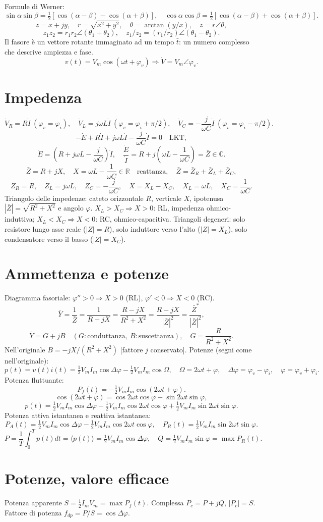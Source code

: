 \documentclass[11pt,a4paper]{article}
\newcommand{\pagina}[2]{\clearpage\section*{#2}}
\begin{document}
Formule di Werner:
\[\sin\alpha\sin\beta=\tfrac12[\cos(\alpha-\beta)-\cos(\alpha+\beta)],\quad\cos\alpha\cos\beta=\tfrac12[\cos(\alpha-\beta)+\cos(\alpha+\beta)].\]
\[z=x+jy,\quad r=\sqrt{x^2+y^2},\quad\theta=\arctan(y/x),\quad z=r\angle\theta,\]
\[z_1z_2=r_1r_2\angle(\theta_1+\theta_2),\quad z_1/z_2=(r_1/r_2)\angle(\theta_1-\theta_2).\]
Il fasore è un vettore rotante immaginato ad un tempo $\bar t$: un numero complesso che descrive ampiezza e fase.
\[v(t)=V_m\cos(\omega t+\varphi_v)\Rightarrow\dot V=V_m\angle\varphi_v.\]
\pagina{24}{Impedenza}
\[\dot V_R=R\dot I\ (\varphi_v=\varphi_i),\quad \dot V_L=j\omega L\dot I\ (\varphi_v=\varphi_i+\pi/2),\quad\dot V_C=-\frac j{\omega C}\dot I\ (\varphi_v=\varphi_i-\pi/2).\]
\[-\dot E+R\dot I+j\omega L\dot I-\frac j{\omega C}\dot I=0\quad\text{LKT},\]
\[\dot E=\left(R+j\omega L-\frac j{\omega C}\right)\dot I,\quad\frac{\dot E}{\dot I}=R+j\left(\omega L-\frac1{\omega C}\right)=\bar Z\in\mathbb C.\]
\[\bar Z=R+jX,\quad X=\omega L-\frac1{\omega C}\in\mathbb R\quad\text{reattanza},\quad\bar Z=\bar Z_R+\bar Z_L+\bar Z_C,\]
\[\bar Z_R=R,\quad\bar Z_L=j\omega L,\quad\bar Z_C=-\frac j{\omega C},\quad X=X_L-X_C,\quad X_L=\omega L,\quad X_C=\frac1{\omega C}.\]
Triangolo delle impedenze: cateto orizzontale $R$, verticale $X$, ipotenusa $|\bar Z|=\sqrt{R^2+X^2}$ e angolo $\varphi$. $X_L>X_C\Rightarrow X>0$: RL, impedenza ohmico-induttiva; $X_L<X_C\Rightarrow X<0$: RC, ohmico-capacitiva. Triangoli degeneri: solo resistore lungo asse reale ($|Z|=R$), solo induttore verso l'alto ($|Z|=X_L$), solo condensatore verso il basso ($|Z|=X_C$).
\pagina{25}{Ammettenza e potenze}
Diagramma fasoriale: $\varphi''>0\Rightarrow X>0$ (RL), $\varphi'<0\Rightarrow X<0$ (RC).
\[\bar Y=\frac1{\bar Z}=\frac1{R+jX}=\frac{R-jX}{R^2+X^2}=\frac{R-jX}{|\bar Z|^2}=\frac{\bar Z^*}{|\bar Z|^2},\]
\[\bar Y=G+jB\quad(G:\text{conduttanza},\ B:\text{suscettanza}),\quad G=\frac R{R^2+X^2}.\]
Nell'originale $B=-jX/(R^2+X^2)$ [fattore $j$ conservato]. Potenze (segni come nell'originale):
\[p(t)=v(t)i(t)=\tfrac12V_mI_m\cos\Delta\varphi-\tfrac12V_mI_m\cos\Omega,\quad\Omega=2\omega t+\varphi,\quad\Delta\varphi=\varphi_v-\varphi_i,\quad\varphi=\varphi_v+\varphi_i.\]
Potenza fluttuante:
\[P_f(t)=-\tfrac12V_mI_m\cos(2\omega t+\varphi).\]
\[\cos(2\omega t+\varphi)=\cos2\omega t\cos\varphi-\sin2\omega t\sin\varphi,\]
\[p(t)=\tfrac12V_mI_m\cos\Delta\varphi-\tfrac12V_mI_m\cos2\omega t\cos\varphi+\tfrac12V_mI_m\sin2\omega t\sin\varphi.\]
Potenza attiva istantanea e reattiva istantanea:
\[P_A(t)=\tfrac12V_mI_m\cos\Delta\varphi-\tfrac12V_mI_m\cos2\omega t\cos\varphi,\quad P_R(t)=\tfrac12V_mI_m\sin2\omega t\sin\varphi.\]
\[P=\frac1T\int_0^Tp(t)dt=\langle p(t)\rangle=\tfrac12V_mI_m\cos\Delta\varphi,\quad Q=\tfrac12V_mI_m\sin\varphi=\max P_R(t).\]
\pagina{26}{Potenze, valore efficace}
Potenza apparente $S=\tfrac12I_mV_m=\max P_f(t)$. Complessa $P_c=P+jQ$, $|P_c|=S$. Fattore di potenza $f_{dp}=P/S=\cos\Delta\varphi$.
\end{document}
